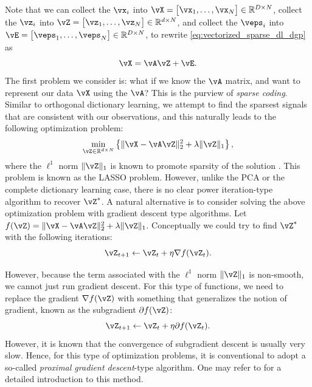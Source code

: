 \documentclass[../../book-main.tex]{subfiles}
\begin{document}
Note that we can collect the \(\vx_{i}\) into \(\vX = \mat{\vx_{1}, \dots, \vx_{N}} \in \R^{D \times N}\), collect the \(\vz_{i}\) into \(\vZ = \mat{\vz_{1}, \dots, \vz_{N}} \in \R^{d  \times N}\), and collect the \(\veps_{i}\) into \(\vE = \mat{\veps_{1}, \dots, \veps_{N}} \in \R^{D \times N}\), to rewrite \eqref{eq:vectorized_sparse_dl_dgp} as 
\begin{equation}\label{eq:sparse_dl_dgp}
    \vX = \vA\vZ + \vE.
\end{equation}
The first problem we consider is: what if we know the \(\vA\) matrix, and want to represent our data \(\vX\) using the \(\vA\)? This is the purview of \textit{sparse coding}. Similar to orthogonal dictionary learning, we attempt to find the sparsest signals that are consistent with our observations, and this naturally leads to the following optimization problem:
\begin{equation}\label{eq:sparse_dl_lasso}
    \min_{\vZ \in \R^{d \times N}}\bc{\norm{\vX - \vA\vZ}_{2}^{2} + \lambda \norm{\vZ}_{1}},
\end{equation}
where the \(\ell^1\) norm \(\norm{\vZ}_{1}\) is known to promote sparsity of the solution \cite{Wright-Ma-2022}. 
This problem is known as the LASSO problem. However, unlike the PCA or the complete dictionary learning case, there is no clear power iteration-type algorithm to recover \(\vZ^{\ast}\). A natural alternative is to consider solving the above optimization problem with gradient descent type algorithms. Let \(f(\vZ) = \norm{\vX - \vA\vZ}_{2}^{2} + \lambda \norm{\vZ}_{1}\). Conceptually we could try to find \(\vZ^{\ast}\) with the following iterations:
\begin{equation}
    \vZ_{t+1} \leftarrow \vZ_t + \eta \nabla f(\vZ_t).
\end{equation}

However, because the term associated with the \(\ell^1\) norm \(\norm{\vZ}_{1}\) is non-smooth, we cannot just run gradient descent. For this type of functions, we need to replace the gradient \(\nabla f(\vZ)\) with something that generalizes the notion of gradient, known as the subgradient \(\partial f(\vZ)\):
\begin{equation}
    \vZ_{t+1} \leftarrow \vZ_t + \eta \partial f(\vZ_t).
\end{equation}
However, it is known that the convergence of subgradient descent is usually very slow. Hence, for this type of optimization problems, it is conventional to adopt a so-called {\em proximal gradient descent}-type algorithm. One may refer to \cite{Wright-Ma-2022} for a detailed introduction to this method. 
\end{document}
